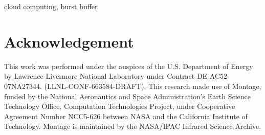 \documentclass[10pt, conference, compsocconf]{IEEEtran}
\begin{document}
\begin{IEEEkeywords}
	cloud computing, burst buffer
\end{IEEEkeywords}

\IEEEpeerreviewmaketitle





%



%








\section*{Acknowledgement}
This work was performed under the auspices of the U.S. Department of Energy by
Lawrence Livermore National Laboratory under Contract DE-AC52-07NA27344.
(LLNL-CONF-663584-DRAFT).
This research made use of Montage, funded by the National Aeronautics and Space Administration's
Earth Science Technology Office, Computation Technologies Project, under
Cooperative Agreement Number NCC5-626 between NASA and the California Institute
of Technology. Montage is maintained by the NASA/IPAC Infrared Science Archive.

\end{document}
